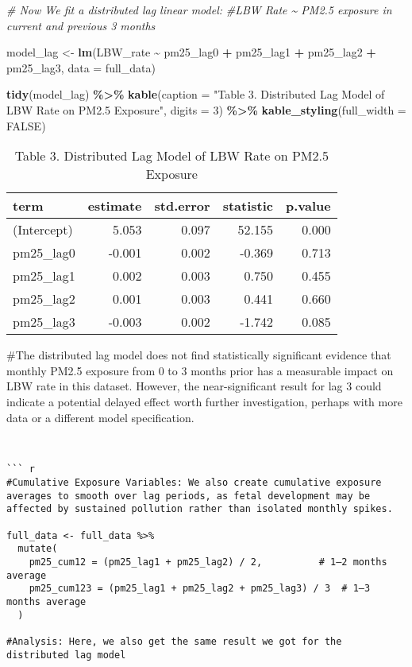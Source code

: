 \documentclass[
]{article}
\newenvironment{Shaded}{\begin{snugshade}}{\end{snugshade}}
\newcommand{\AttributeTok}[1]{\textcolor[rgb]{0.13,0.29,0.53}{#1}}
\newcommand{\CommentTok}[1]{\textcolor[rgb]{0.56,0.35,0.01}{\textit{#1}}}
\newcommand{\ConstantTok}[1]{\textcolor[rgb]{0.56,0.35,0.01}{#1}}
\newcommand{\DecValTok}[1]{\textcolor[rgb]{0.00,0.00,0.81}{#1}}
\newcommand{\FunctionTok}[1]{\textcolor[rgb]{0.13,0.29,0.53}{\textbf{#1}}}
\newcommand{\NormalTok}[1]{#1}
\newcommand{\OtherTok}[1]{\textcolor[rgb]{0.56,0.35,0.01}{#1}}
\newcommand{\SpecialCharTok}[1]{\textcolor[rgb]{0.81,0.36,0.00}{\textbf{#1}}}
\newcommand{\StringTok}[1]{\textcolor[rgb]{0.31,0.60,0.02}{#1}}
\begin{document}
\begin{Shaded}
\begin{Highlighting}[]
\CommentTok{\# Now We fit a distributed lag linear model:}
\CommentTok{\#LBW Rate \textasciitilde{} PM2.5 exposure in current and previous 3 months}

\NormalTok{model\_lag }\OtherTok{\textless{}{-}} \FunctionTok{lm}\NormalTok{(LBW\_rate }\SpecialCharTok{\textasciitilde{}}\NormalTok{ pm25\_lag0 }\SpecialCharTok{+}\NormalTok{ pm25\_lag1 }\SpecialCharTok{+}\NormalTok{ pm25\_lag2 }\SpecialCharTok{+}\NormalTok{ pm25\_lag3, }\AttributeTok{data =}\NormalTok{ full\_data)}

\FunctionTok{tidy}\NormalTok{(model\_lag) }\SpecialCharTok{\%\textgreater{}\%}
  \FunctionTok{kable}\NormalTok{(}\AttributeTok{caption =} \StringTok{"Table 3. Distributed Lag Model of LBW Rate on PM2.5 Exposure"}\NormalTok{, }\AttributeTok{digits =} \DecValTok{3}\NormalTok{) }\SpecialCharTok{\%\textgreater{}\%}
  \FunctionTok{kable\_styling}\NormalTok{(}\AttributeTok{full\_width =} \ConstantTok{FALSE}\NormalTok{)}
\end{Highlighting}
\end{Shaded}

\begin{longtable}[t]{lrrrr}
\caption{\label{tab:Distributed Lag Model}Table 3. Distributed Lag Model of LBW Rate on PM2.5 Exposure}\\
\toprule
term & estimate & std.error & statistic & p.value\\
\midrule
(Intercept) & 5.053 & 0.097 & 52.155 & 0.000\\
pm25\_lag0 & -0.001 & 0.002 & -0.369 & 0.713\\
pm25\_lag1 & 0.002 & 0.003 & 0.750 & 0.455\\
pm25\_lag2 & 0.001 & 0.003 & 0.441 & 0.660\\
pm25\_lag3 & -0.003 & 0.002 & -1.742 & 0.085\\
\bottomrule
\end{longtable}

\#The distributed lag model does not find statistically significant
evidence that monthly PM2.5 exposure from 0 to 3 months prior has a
measurable impact on LBW rate in this dataset. However, the
near-significant result for lag 3 could indicate a potential delayed
effect worth further investigation, perhaps with more data or a
different model specification.

\begin{verbatim}


``` r
#Cumulative Exposure Variables: We also create cumulative exposure averages to smooth over lag periods, as fetal development may be affected by sustained pollution rather than isolated monthly spikes.

full_data <- full_data %>%
  mutate(
    pm25_cum12 = (pm25_lag1 + pm25_lag2) / 2,          # 1–2 months average
    pm25_cum123 = (pm25_lag1 + pm25_lag2 + pm25_lag3) / 3  # 1–3 months average
  )
  
#Analysis: Here, we also get the same result we got for the distributed lag model
\end{verbatim}
\end{document}
